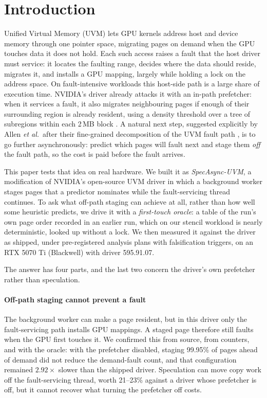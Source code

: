 \section{Introduction}

Unified Virtual Memory (UVM) lets GPU kernels address host and device memory
through one pointer space, migrating pages on demand when the GPU touches data
it does not hold. Each such access raises a fault that the host driver must
service: it locates the faulting range, decides where the data should reside,
migrates it, and installs a GPU mapping, largely while holding a lock on the
address space. On fault-intensive workloads this host-side path is a large
share of execution time. NVIDIA's driver already attacks it with an in-path
prefetcher: when it services a fault, it also migrates neighbouring pages if
enough of their surrounding region is already resident, using a density
threshold over a tree of subregions within each 2\,MB block
\cite{ganguly2019interplay}. A natural next step, suggested explicitly by Allen \emph{et al.}\ after their
fine-grained decomposition of the UVM fault path \cite{allen2024finegrain}, is
to go further asynchronously: predict which pages will fault next and stage
them \emph{off} the fault path, so the cost is paid before the fault arrives.

This paper tests that idea on real hardware. We built it as
\emph{SpecAsync-UVM}, a modification of NVIDIA's open-source UVM driver in which
a background worker stages pages that a predictor nominates while the
fault-servicing thread continues. To ask what off-path staging can achieve at
all, rather than how well some heuristic predicts, we drive it with a
\emph{first-touch oracle}: a table of the run's own page order recorded in an
earlier run, which on our stencil workload is nearly deterministic, looked up
without a lock. We then measured it against the driver as shipped, under
pre-registered analysis plans with falsification triggers, on an RTX 5070 Ti
(Blackwell) with driver 595.91.07.

The answer has four parts, and the last two concern the driver's own
prefetcher rather than speculation.

\paragraph{Off-path staging cannot prevent a fault}
The background worker can make a page resident, but in this driver only the
fault-servicing path installs GPU mappings. A staged page therefore still
faults when the GPU first touches it. We confirmed this from source, from
counters, and with the oracle: with the prefetcher disabled, staging 99.95\% of pages ahead of demand did not reduce the demand-fault count, and that
configuration remained $2.92\times$ slower than the shipped driver. Speculation
can move copy work off the fault-servicing thread, worth 21--23\% against a
driver whose prefetcher is off, but it cannot recover what turning the
prefetcher off costs.

